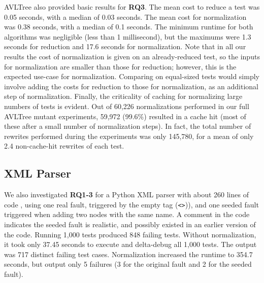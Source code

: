 AVLTree also provided basic results for {\bf RQ3}. The mean cost to reduce a
test was 0.05 seconds, with a median of 0.03 seconds.  The mean
cost for normalization was 0.38 seconds, with a median of 0.1 seconds.
The minimum runtime for both algorithms was negligible (less than 1
millisecond), but the maximums were 1.3 seconds for reduction and 17.6
seconds for normalization.  Note that in all our results the cost of
normalization is given on an already-reduced test, so the inputs
for normalization are smaller than those for reduction; however, this
is the expected use-case for normalization.  Comparing on equal-sized
tests would simply involve adding the costs for reduction to those for
normalization, as an additional step of normalization.  Finally, the
criticality of caching for normalizing large numbers of tests is
evident.  Out of 60,226 normalizations performed in our full AVLTree mutant
experiments, 59,972 (99.6\%) resulted in a cache hit (most of these
after a small number of normalization steps).  In fact, the total
number of rewrites performed during the experiments was only 145,780,
for a mean of only 2.4 non-cache-hit rewrites of each test.

\subsection{XML Parser}

We also investigated {\bf RQ1-3} for a
Python XML parser with about 260 lines of code \cite{myxml}, using one
real fault, triggered by the empty tag ({\tt <>})), and one
seeded fault triggered when adding two nodes with the same
name.  A comment in the code indicates the seeded fault is realistic,
and possibly existed in an earlier version of the code.  Running 1,000 tests
produced 848 failing tests.  Without normalization, it took only
37.45 seconds to execute and delta-debug all 1,000 tests.  The output was 717 distinct failing test
cases.  Normalization increased the runtime to 354.7 seconds, but
output only 5 failures (3 for the original fault and 2 for the seeded fault).

